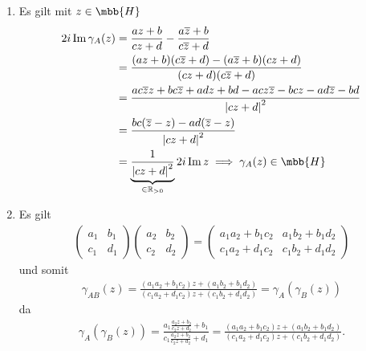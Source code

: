 \documentclass[ngerman]{report}
\begin{document}
    \begin{answer}
        \begin{enumerate}
            \item Es gilt mit $z\in\mbb{H}$
            \begin{align}
                2i\Im \gamma_A(z) &=\frac{az+b}{cz+d}-\frac{a\overline{z}+b}{c\overline{z}+d}\nonumber \\
                &= \frac{(az+b)(c\overline{z}+d)-(a\overline{z}+b)(cz+d)}{(cz+d)(c\overline{z}+d)}\nonumber\\ 
                &= \frac{ac\overline{z}z+bc\overline{z}+adz+bd-acz\overline{z}-bcz-ad\overline{z}-bd}{\abs{cz+d}^2}\nonumber\\ 
                &= \frac{bc(\overline{z}-z)-ad(\overline{z}-z)}{\abs{cz+d}^2} \nonumber\\
                &= \underbrace{\frac{1}{\abs{cz+d}^2}}_{\in\R_{>0}}2i\Im z \implies \gamma_A(z) \in \mbb{H}\label{eq:2-1}
            \end{align}
            \item Es gilt
            \begin{align*}
                \begin{pmatrix}
                    a_1 & b_1\\
                    c_1 & d_1
                \end{pmatrix}
                \begin{pmatrix}
                    a_2 & b_2\\
                    c_2 & d_2
                \end{pmatrix}
                = \begin{pmatrix}
                    a_1a_2+b_1c_2 & a_1b_2+b_1d_2\\
                    c_1a_2+d_1c_2 & c_1b_2+d_1d_2
                \end{pmatrix}
            \end{align*}
            und somit
            \begin{align*}
                \gamma_{AB}(z) = \frac{(a_1a_2+b_1c_2)z+(a_1b_2+b_1d_2)}{(c_1a_2+d_1c_2)z+(c_1b_2+d_1d_2)} = \gamma_A(\gamma_B(z))
            \end{align*}
            da
            \begin{align*}
                \gamma_A(\gamma_B(z)) = \frac{a_1\frac{a_2z+b_2}{c_2z+d_2}+b_1}{c_1\frac{a_2z+b_2}{c_2z+d_2}+d_1} = \frac{(a_1a_2+b_1c_2)z+(a_1b_2+b_1d_2)}{(c_1a_2+d_1c_2)z+(c_1b_2+d_1d_2)}.
            \end{align*}

\end{enumerate}
\end{answer}
\end{document}
